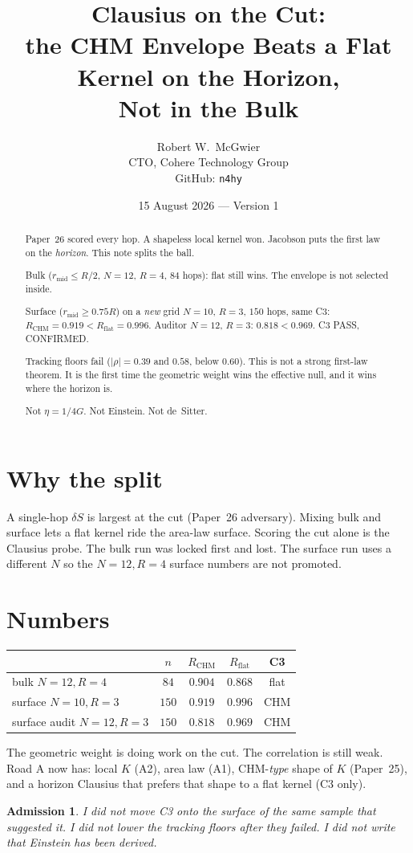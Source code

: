\documentclass[11pt]{article}
\title{\textbf{Clausius on the Cut:\\
the CHM Envelope Beats a Flat Kernel on the Horizon,\\
Not in the Bulk}}
\author{Robert W.\ McGwier\\
\small CTO, Cohere Technology Group\\
\small GitHub: \texttt{n4hy}}
\date{15 August 2026 --- Version 1}
\newtheorem*{admission}{Admission}
\begin{document}
\maketitle

\begin{abstract}
\noindent
Paper~26 scored every hop. A shapeless local kernel won.
Jacobson puts the first law on the \emph{horizon}. This note
splits the ball.

Bulk ($r_{\mathrm{mid}}\le R/2$, $N=12$, $R=4$, $84$ hops):
flat still wins. The envelope is not selected inside.

Surface ($r_{\mathrm{mid}}\ge 0.75R$) on a \emph{new} grid
$N=10$, $R=3$, $150$ hops, same C3: $R_{\mathrm{CHM}}=0.919
< R_{\mathrm{flat}}=0.996$. Auditor $N=12$, $R=3$:
$0.818<0.969$. C3 PASS, CONFIRMED.

Tracking floors fail ($\lvert\rho\rvert=0.39$ and $0.58$,
below $0.60$). This is not a strong first-law theorem. It is
the first time the geometric weight wins the effective null,
and it wins where the horizon is.

Not $\eta=1/4G$. Not Einstein. Not de~Sitter.
\end{abstract}

\section{Why the split}

A single-hop $\delta S$ is largest at the cut (Paper~26
adversary). Mixing bulk and surface lets a flat kernel ride
the area-law surface. Scoring the cut alone is the Clausius
probe. The bulk run was locked first and lost. The surface
run uses a different $N$ so the $N=12,R=4$ surface numbers
are not promoted.

\section{Numbers}

\begin{center}
\begin{tabular}{lcccc}
\hline
 & $n$ & $R_{\mathrm{CHM}}$ & $R_{\mathrm{flat}}$ & C3 \\
\hline
bulk $N=12,R=4$ & $84$ & $0.904$ & $0.868$ & flat \\
surface $N=10,R=3$ & $150$ & $0.919$ & $0.996$ & CHM \\
surface audit $N=12,R=3$ & $150$ & $0.818$ & $0.969$ & CHM \\
\hline
\end{tabular}
\end{center}

The geometric weight is doing work on the cut. The correlation
is still weak. Road A now has: local $K$ (A2), area law (A1),
CHM-\emph{type} shape of $K$ (Paper~25), and a horizon
Clausius that prefers that shape to a flat kernel (C3 only).

\begin{admission}
I did not move C3 onto the surface of the same sample that
suggested it. I did not lower the tracking floors after they
failed. I did not write that Einstein has been derived.
\end{admission}
\end{document}
